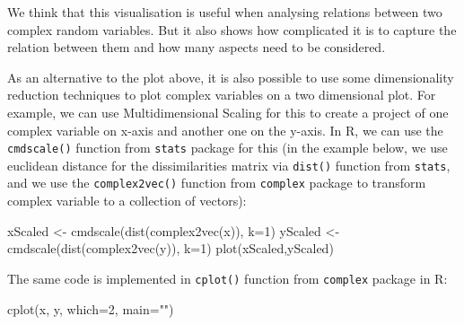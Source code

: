 \documentclass[
]{book}
\newenvironment{Shaded}{\begin{snugshade}}{\end{snugshade}}
\newcommand{\AttributeTok}[1]{\textcolor[rgb]{0.77,0.63,0.00}{#1}}
\newcommand{\DecValTok}[1]{\textcolor[rgb]{0.00,0.00,0.81}{#1}}
\newcommand{\FunctionTok}[1]{\textcolor[rgb]{0.00,0.00,0.00}{#1}}
\newcommand{\NormalTok}[1]{#1}
\newcommand{\OtherTok}[1]{\textcolor[rgb]{0.56,0.35,0.01}{#1}}
\newcommand{\StringTok}[1]{\textcolor[rgb]{0.31,0.60,0.02}{#1}}
\begin{document}
We think that this visualisation is useful when analysing relations between two complex random variables. But it also shows how complicated it is to capture the relation between them and how many aspects need to be considered.

As an alternative to the plot above, it is also possible to use some dimensionality reduction techniques to plot complex variables on a two dimensional plot. For example, we can use Multidimensional Scaling for this \citep[MDS,][]{refMDS} to create a project of one complex variable on x-axis and another one on the y-axis. In R, we can use the \texttt{cmdscale()} function from \texttt{stats} package for this (in the example below, we use euclidean distance for the dissimilarities matrix via \texttt{dist()} function from \texttt{stats}, and we use the \texttt{complex2vec()} function from \texttt{complex} package to transform complex variable to a collection of vectors):

\begin{Shaded}
\begin{Highlighting}[]
\NormalTok{xScaled }\OtherTok{\textless{}{-}} \FunctionTok{cmdscale}\NormalTok{(}\FunctionTok{dist}\NormalTok{(}\FunctionTok{complex2vec}\NormalTok{(x)), }\AttributeTok{k=}\DecValTok{1}\NormalTok{)}
\NormalTok{yScaled }\OtherTok{\textless{}{-}} \FunctionTok{cmdscale}\NormalTok{(}\FunctionTok{dist}\NormalTok{(}\FunctionTok{complex2vec}\NormalTok{(y)), }\AttributeTok{k=}\DecValTok{1}\NormalTok{)}
\FunctionTok{plot}\NormalTok{(xScaled,yScaled)}
\end{Highlighting}
\end{Shaded}

The same code is implemented in \texttt{cplot()} function from \texttt{complex} package in R:

\begin{Shaded}
\begin{Highlighting}[]
\FunctionTok{cplot}\NormalTok{(x, y, }\AttributeTok{which=}\DecValTok{2}\NormalTok{, }\AttributeTok{main=}\StringTok{""}\NormalTok{)}
\end{Highlighting}
\end{Shaded}
\end{document}
